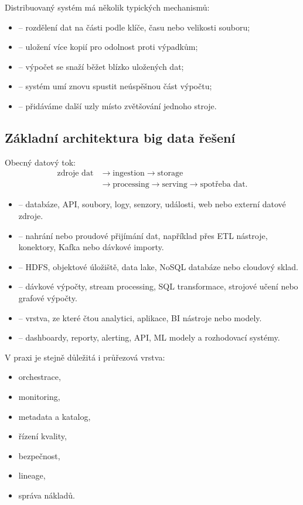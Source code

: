 Distribuovaný systém má několik typických mechanismů:
\begin{itemize}
    \item {} -- rozdělení dat na části podle klíče, času nebo velikosti souboru;
    \item {} -- uložení více kopií pro odolnost proti výpadkům;
    \item {} -- výpočet se snaží běžet blízko uložených dat;
    \item {} -- systém umí znovu spustit neúspěšnou část výpočtu;
    \item {} -- přidáváme další uzly místo zvětšování jednoho stroje.
\end{itemize}

\subsection{Základní architektura big data řešení}

Obecný datový tok:
\[
\begin{aligned}
\text{zdroje dat}
&\rightarrow
\text{ingestion}
\rightarrow
\text{storage}\\
&\rightarrow
\text{processing}
\rightarrow
\text{serving}
\rightarrow
\text{spotřeba dat}.
\end{aligned}
\]

\begin{itemize}
    \item {} -- databáze, API, soubory, logy, senzory, události, web nebo externí datové
    zdroje.
    \item {} -- nahrání nebo proudové přijímání dat, například přes ETL nástroje,
    konektory, Kafka nebo dávkové importy.
    \item {} -- HDFS, objektové úložiště, data lake, NoSQL databáze nebo cloudový sklad.
    \item {} -- dávkové výpočty, stream processing, SQL transformace, strojové učení
    nebo grafové výpočty.
    \item {} -- vrstva, ze které čtou analytici, aplikace, BI nástroje nebo modely.
    \item {} -- dashboardy, reporty, alerting, API, ML modely a rozhodovací systémy.
\end{itemize}

V praxi je stejně důležitá i průřezová vrstva:
\begin{itemize}
    \item orchestrace,
    \item monitoring,
    \item metadata a katalog,
    \item řízení kvality,
    \item bezpečnost,
    \item lineage,
    \item správa nákladů.
\end{itemize}

